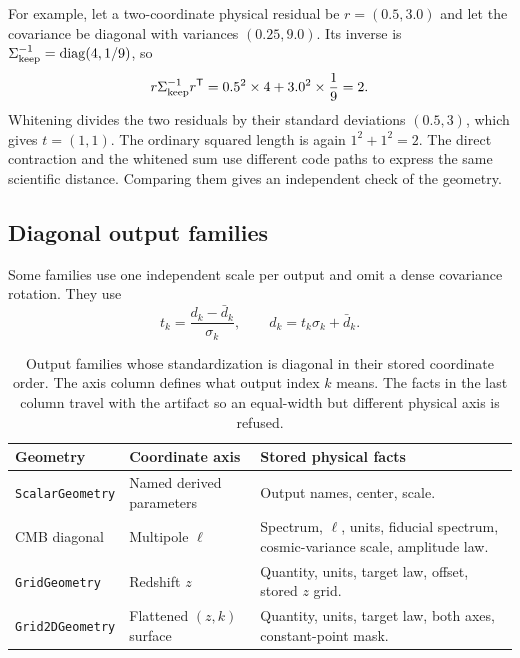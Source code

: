 \documentclass[10pt,aps,prd,twocolumn,nofootinbib]{revtex4-2}
\newcommand{\code}[1]{\texttt{#1}}
\begin{document}
For example, let a two-coordinate physical residual be $r=(0.5,3.0)$ and let
the covariance be diagonal with variances $(0.25,9.0)$.  Its inverse is
$\Sigma_{\rm keep}^{-1}=\mathrm{diag}(4,1/9)$, so
\begin{equation*}
 r\Sigma_{\rm keep}^{-1}r^{\mathsf T}
 =0.5^2\times4+3.0^2\times\frac{1}{9}=2.
\end{equation*}
Whitening divides the two residuals by their standard deviations $(0.5,3)$,
which gives $t=(1,1)$.  The ordinary squared length is again
$1^2+1^2=2$.  The direct contraction and the whitened sum use different code
paths to express the same scientific distance.  Comparing them gives an
independent check of the geometry.

\subsection{Diagonal output families}

Some families use one independent scale per output and omit a dense covariance
rotation.  They use
\begin{equation}
  t_k=\frac{d_k-\bar d_k}{\sigma_k},
  \qquad
  d_k=t_k\sigma_k+\bar d_k.
\end{equation}

\begin{table}[t]
\centering
\begin{tabular}{p{}p{}p{}}
\toprule
Geometry & Coordinate axis & Stored physical facts \\
\midrule
\code{ScalarGeometry} & Named derived parameters & Output names, center,
scale.  \\
CMB diagonal & Multipole $\ell$ & Spectrum, $\ell$, units,
fiducial spectrum, cosmic-variance scale, amplitude law.  \\
\code{GridGeometry} & Redshift $z$ & Quantity, units, target law, offset,
stored $z$ grid.  \\
\code{Grid2DGeometry} & Flattened $(z,k)$ surface & Quantity, units, target
law, both axes, constant-point mask.  \\
\bottomrule
\end{tabular}
\caption{Output families whose standardization is diagonal in their stored
coordinate order.  The axis column defines what output index $k$ means.  The
facts in the last column travel with the artifact so an equal-width but
different physical axis is refused.}
\label{tab:diagonal-geometries}
\end{table}
\end{document}
